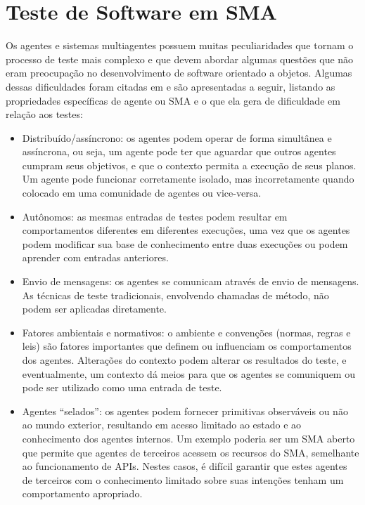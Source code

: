 \section{Teste de Software em SMA} \label{sec:testesma}

Os agentes e sistemas multiagentes possuem muitas peculiaridades que tornam o processo de teste mais complexo e que devem abordar algumas questões que não eram preocupação no desenvolvimento de software orientado a objetos. Algumas dessas dificuldades foram citadas em \cite{rouff2002test,houhamdi2011multi,nguyen2009thesis} e são apresentadas a seguir, listando as propriedades específicas de agente ou SMA e o que ela gera de dificuldade em relação aos testes:

\begin{itemize}
\item Distribuído/assíncrono: os agentes podem operar de forma simultânea e assíncrona, ou seja, um agente pode ter que aguardar que outros agentes cumpram seus objetivos, e que o contexto permita a execução de seus planos. Um agente pode funcionar corretamente isolado, mas incorretamente quando colocado em uma comunidade de agentes ou vice-versa.
\item Autônomos: as mesmas entradas de testes podem resultar em comportamentos diferentes em diferentes execuções, uma vez que os agentes podem modificar sua base de conhecimento entre duas execuções ou podem aprender com entradas anteriores.
\item Envio de mensagens: os agentes se comunicam através de envio de mensagens. As técnicas de teste tradicionais, envolvendo chamadas de método, não podem ser aplicadas diretamente.
\item Fatores ambientais e normativos: o ambiente e convenções (normas, regras e leis) são fatores importantes que definem ou influenciam os comportamentos dos agentes. Alterações do contexto podem alterar os resultados do teste, e eventualmente, um contexto dá meios para que os agentes se comuniquem ou pode ser utilizado como uma entrada de teste.
\item Agentes “selados”: os agentes podem fornecer primitivas observáveis ou não ao mundo exterior, resultando em acesso limitado ao estado e ao conhecimento dos agentes internos. Um exemplo poderia ser um SMA aberto que permite que agentes de terceiros acessem os recursos do SMA, semelhante ao funcionamento de APIs. Nestes casos, é difícil garantir que estes agentes de terceiros com o conhecimento limitado sobre suas intenções tenham um comportamento apropriado.
\end{itemize}

